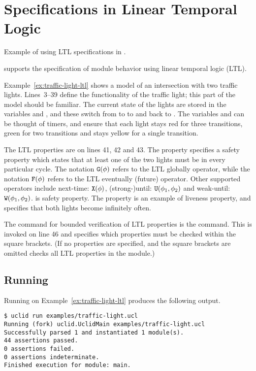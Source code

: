 \section{Specifications in Linear Temporal Logic}
\begin{uclidlisting}[htbp]
    
    \caption{Example of using LTL specifications in \uclid{}.}
    \label{ex:traffic-light-ltl}
\end{uclidlisting}

\uclid{} supports the specification of module behavior using linear temporal logic (LTL). 

Example~\ref{ex:traffic-light-ltl} shows a \uclid{} model of an intersection with two traffic lights. Lines~3--39 define the functionality of the traffic light; this part of the model should be familiar. The current state of the lights are stored in the variables  and , and these switch from  to  to  and back to . The variables  and  can be thought of timers, and ensure that each light stays red for three transitions, green for two transitions and stays yellow for a single transition. 

The LTL properties are on lines 41, 42 and 43. The property  specifies a safety property which states that at least one of the two lights must be  in every particular cycle. The notation $\texttt{G}(\phi)$ refers to the LTL globally operator, while the notation $\texttt{F}(\phi)$ refers to the LTL eventually (future) operator. Other supported operators include next-time: $\texttt{X}(\phi)$, (strong-)until: $\texttt{U}(\phi_1, \phi_2)$ and weak-until: $\texttt{W}(\phi_1, \phi_2)$.  is safety property. The property  is an example of liveness property, and specifies that both lights become  infinitely often.

The command for bounded verification of LTL properties is the  command. This is invoked on line 46 and specifies which properties must be checked within the square brackets. (If no properties are specified, and the square brackets are omitted  checks all LTL properties in the module.)

\subsection{Running \uclid{}}
Running \uclid{} on Example~\ref{ex:traffic-light-ltl} produces the following output.
\begin{Verbatim}[frame=single, samepage=true]
$ uclid run examples/traffic-light.ucl
Running (fork) uclid.UclidMain examples/traffic-light.ucl
Successfully parsed 1 and instantiated 1 module(s).
44 assertions passed.
0 assertions failed.
0 assertions indeterminate.
Finished execution for module: main.
\end{Verbatim}

